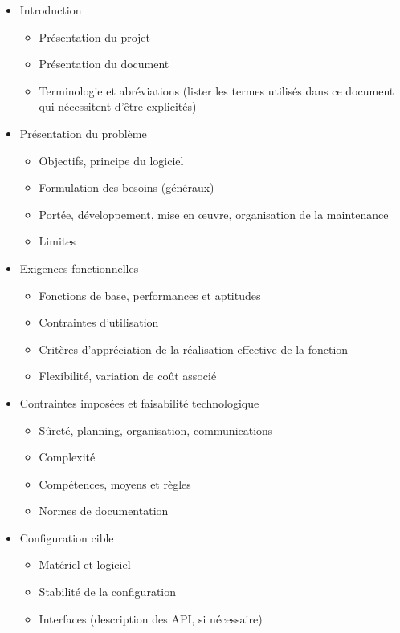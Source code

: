 \documentclass[a4paper]{article}
\begin{document}
\begin{itemize}
\item Introduction
  \begin{itemize}
  \item Présentation du projet
  \item Présentation du document
  \item Terminologie et abréviations
    (lister les termes utilisés dans ce document qui nécessitent d'être explicités)
  \end{itemize}
\item Présentation du problème
  \begin{itemize}
  \item Objectifs, principe du logiciel
  \item Formulation des besoins (généraux)
  \item Portée, développement, mise en œuvre, organisation de la maintenance
  \item Limites
  \end{itemize}
\item Exigences fonctionnelles
  \begin{itemize}
  \item Fonctions de base, performances et aptitudes
  \item Contraintes d'utilisation
  \item Critères d'appréciation de la réalisation effective de la fonction
  \item Flexibilité, variation de coût associé
  \end{itemize}
\item Contraintes imposées et faisabilité technologique
  \begin{itemize}
  \item Sûreté, planning, organisation, communications
  \item Complexité
  \item Compétences, moyens et règles
  \item Normes de documentation
  \end{itemize}
\item Configuration cible
  \begin{itemize}
  \item Matériel et logiciel
  \item Stabilité de la configuration
  \item Interfaces (description des API, si nécessaire)
  \end{itemize}

\end{itemize}
\end{document}
